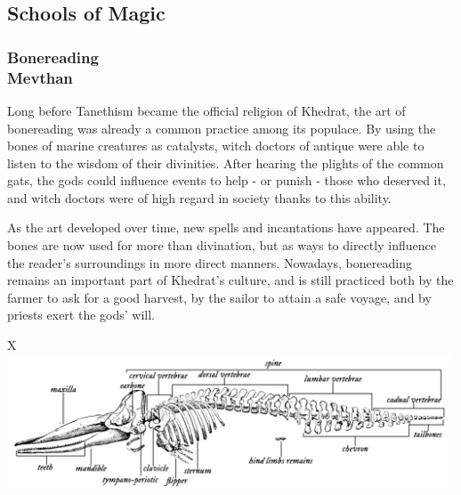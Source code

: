 \subsection*{Schools of Magic} \label{ssec::schoolsofmagic}

\subsubsection{Bonereading\\ \small{Mevthan}}
Long before Tanethism became the official religion of Khedrat, the art of bonereading was already a common practice among its populace.
By using the bones of marine creatures as catalysts, witch doctors of antique were able to listen to the wisdom of their divinities.
After hearing the plights of the common gats, the gods could influence events to help - or punish - those who deserved it, and witch doctors were of high regard in society thanks to this ability.

As the art developed over time, new spells and incantations have appeared.
The bones are now used for more than divination, but as ways to directly influence the reader's surroundings in more direct manners.
Nowadays, bonereading remains an important part of Khedrat's culture, and is still practiced both by the farmer to ask for a good harvest, by the sailor to attain a safe voyage, and by priests exert the gods' will.


\begin{table}[b]%
    \begin{DndTable}[width=\linewidth]{X}
        \centering
        \includegraphics[width=0.99\textwidth]{01yuadrem/img/23sperm_whale_skeleton.png}
    \end{DndTable}
\end{table}

